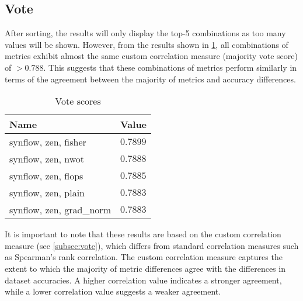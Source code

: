 
\subsection{Vote}




After sorting, the results will only display the top-5 combinations as too many values will be shown. However, from the results shown in \cref{tab:vote}, all combinations of metrics exhibit almost the same custom correlation measure (majority vote score) of $ > 0.788$. This suggests that these combinations of metrics perform similarly in terms of the agreement between the majority of metrics and accuracy differences.

\begin{table}[h!]
\caption{Vote scores}
\centering
\begin{tabular}{ll}
\textbf{Name} & \textbf{Value} \\ \hline
\multicolumn{1}{l|}{synflow, zen, fisher} & $0.7899$ \\
\multicolumn{1}{l|}{\cellcolor{verylightgray}synflow, zen, nwot} & \cellcolor{verylightgray}$0.7888$ \\
\multicolumn{1}{l|}{synflow, zen, flops} & $0.7885$ \\
\multicolumn{1}{l|}{\cellcolor{verylightgray}synflow, zen, plain} & \cellcolor{verylightgray}$0.7883$ \\
\multicolumn{1}{l|}{synflow, zen, grad\_norm} & $0.7883$ \\
\end{tabular}
\label{tab:vote}
\end{table}

It is important to note that these results are based on the custom correlation measure (see \cref{subsec:vote}), which differs from standard correlation measures such as Spearman's rank correlation. The custom correlation measure captures the extent to which the majority of metric differences agree with the differences in dataset accuracies. A higher correlation value indicates a stronger agreement, while a lower correlation value suggests a weaker agreement.
